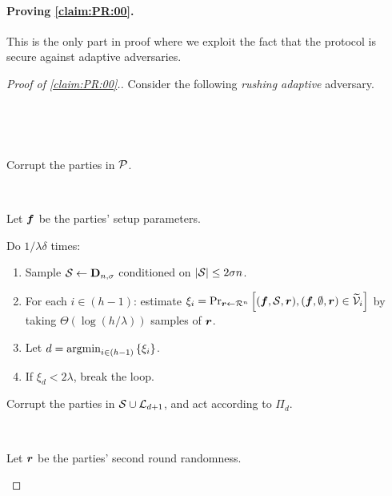 \paragraph{Proving \cref{claim:PR:00}.}
This is the only part in proof where we exploit the fact that the protocol is secure against    adaptive adversaries.
\begin{proof}[Proof of \cref{claim:PR:00}.]
	
	
	Consider the following  \emph{rushing adaptive} adversary.
	
	{ \samepage
	\begin{algorithm}[$\Ac$]\label{alg:PR:00}~
		
\begin{description}
	
\item[Pre interaction:]~




Corrupt the parties in $\mathcal{P}$.


		\item[First round.] ~
		
		Let ${ \boldsymbol{f}}$ be the parties' setup parameters.
	
	
	   Do $1/\lambda\delta$ times:
		\begin{enumerate}
			
			\item  Sample  $\mathcal{S} \gets \mathbf{D}_{n,\sigma} $ conditioned on $ \left|{\cal{S}}\right| \le 2\sigma n$.
			\item  	For each   $i\in (h-1)$: estimate $\xi_i =  \Pr_{{ \boldsymbol{r}} \gets \mathcal{R}^n}\left[({ \boldsymbol{f}},{\cal{S}},{ \boldsymbol{r}}),({ \boldsymbol{f}},\emptyset,{ \boldsymbol{r}})  \in \widetilde{\mathcal{V}}_{i}\right]$ by taking $\Theta( \log (h/ \lambda))$ samples of ${ \boldsymbol{r}}$.
			
			\item Let $d = \operatorname*{argmin}_{i\in (h-1)} \left\{\xi_i\right\}$.
			
			\item If $\xi_d < 2\lambda$, break the loop.
		
			

		\end{enumerate}
	
	
			
		\item Corrupt the parties in ${\cal{S}} \cup {\cal{L}}_{d+1}$, and act  according to  $\Pi_d$.
			
			
			
			
			
			
			\item[Second round.]~
			
			Let ${ \boldsymbol{r}}$ be the parties' second round randomness.
			

\end{description}
\end{algorithm}}
\end{proof}
